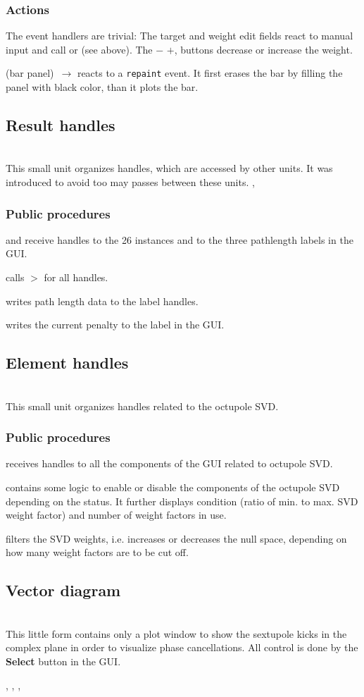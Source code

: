 \documentclass[12pt]{article}
\newcommand\code[1]{{\tt #1}}
\newcommand{\ofld}[1]{\colorbox{black!15}{{{\color{black}\bf #1}}}}
\newcommand{\ofldx}[1]{\colorbox{black!15}{{\color{black}(#1)}}}
\newcommand\guifco[1]{{\color{violet}\code{#1}}}
\newcommand{\unico}[1]{{\color{burntorange}\code{#1}}}
\newcommand{\evcodxf}[2]{\ofldx{#1}~$\rightarrow$ \guifco{#2}}
\newcommand{\gfcod}[2]{\opaguif{#1}$>$\guifco{#2}}
\newcommand{\opagui}[1]{\colorbox{blue!20}{{\color{black}\code{#1}}}}
\newcommand{\oguih}[2]{\subsection{\label{#2}#1}{\Huge\opagui{#2}}\\}
\newcommand{\ogui}[1]{\hyperref[#1]{\opagui{#1}}}
\newcommand{\opaguif}[1]{\colorbox{violet!30}{{\color{black}\code{#1}}}}
\newcommand{\oguif}[1]{\hyperref[#1]{\opaguif{#1}}}
\newcommand{\opauni}[1]{\colorbox{orange!30}{{\color{black}\code{#1}}}}
\newcommand{\ounih}[2]{\subsection{\label{#2}#1}{\Huge\opauni{#2}}\\}
\newcommand{\ouni}[1]{\hyperref[#1]{\opauni{#1}}}
\newcommand{\uses}[1]{\flushleft {\bf Uses:} #1}
\newcommand{\desc}[1]{#1}
\newcommand{\act}[1]{\subsubsection*{Actions} #1}
\newcommand{\ppro}[1]{\subsubsection*{Public procedures} #1}
\begin{document}
\act{
The event handlers are trivial: The target and weight edit fields react to manual input and call \guifco{UpdateTarget} or \guifco{UpdateWeight} (see above). The \ofld{$-$} \ofld{$+$}, buttons decrease or increase the weight.

\evcodxf{bar panel}{PanBarPaint} reacts to a \code{repaint} event. It first erases the bar by filling the panel with black color, than it plots the bar. 

}


\ounih{Result handles}{chromreslib} 

\desc{This small unit organizes handles, which are accessed by other units. It was introduced to avoid too may passes between these units.}
\uses{
\oguif{chamframe}, \ouni{chromlib}
}
\ppro{
\unico{Pass\_CH\_Handles} and \unico{Pass\_LabPath\_Handles} receive handles to the 26 \guifco{chamframe} instances and to the three pathlength labels in the \ogui{opachroma} GUI.

\unico{UpdateHamilton} calls \gfcod{chamframe}{UpdateHam} for all handles.

\unico{UpdatePath} writes path length data to the label handles.

\unico{UpdatePenalty} writes the current penalty to the label in the \ogui{opachroma} GUI.
}

\ounih{Element handles}{chromelelib} 

\desc{This small unit organizes handles related to the octupole SVD.
}
\uses{ \ouni{chromlib} }
\ppro{
\unico{Pass\_Osvd\_Handles} receives handles to all the components of the \ogui{opachroma} GUI related to octupole SVD.

\unico{Osvd\_Status} contains some logic to enable or disable the components of the octupole SVD depending on the status. It further displays condition (ratio of min. to max. SVD weight factor) and number of weight factors in use.

\unico{Osvd\_Wfilter} filters the SVD weights, i.e. increases or decreases the null space, depending on how many weight factors are to be cut off.

}


\oguih{Vector diagram}{ochromsvector} 

\desc{This little form contains only a plot window to show the sextupole kicks in the complex plane in order to visualize phase cancellations. All control is done by the \ofld{Select} button in the \ogui{opachroma} GUI.}

\uses{
\ouni{chromlib}, \ouni{globlib}, \ouni{mathlib}, \ouni{comfigureframe}
}
\end{document}
